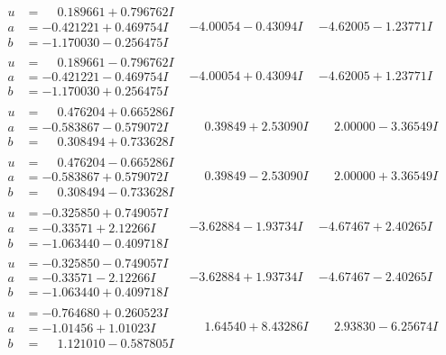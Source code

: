 \documentclass[1p]{elsarticle_modified}
\theoremstyle{definition}
\begin{document}
$$\begin{array}{c|c|c}
\begin{aligned}
u &= \phantom{-}0.189661 + 0.796762 I \\
a &= -0.421221 + 0.469754 I \\
b &= -1.170030 - 0.256475 I\end{aligned}
 & -4.00054 - 0.43094 I & -4.62005 - 1.23771 I \\ \hline\begin{aligned}
u &= \phantom{-}0.189661 - 0.796762 I \\
a &= -0.421221 - 0.469754 I \\
b &= -1.170030 + 0.256475 I\end{aligned}
 & -4.00054 + 0.43094 I & -4.62005 + 1.23771 I \\ \hline\begin{aligned}
u &= \phantom{-}0.476204 + 0.665286 I \\
a &= -0.583867 - 0.579072 I \\
b &= \phantom{-}0.308494 + 0.733628 I\end{aligned}
 & \phantom{-}0.39849 + 2.53090 I & \phantom{-}2.00000 - 3.36549 I \\ \hline\begin{aligned}
u &= \phantom{-}0.476204 - 0.665286 I \\
a &= -0.583867 + 0.579072 I \\
b &= \phantom{-}0.308494 - 0.733628 I\end{aligned}
 & \phantom{-}0.39849 - 2.53090 I & \phantom{-}2.00000 + 3.36549 I \\ \hline\begin{aligned}
u &= -0.325850 + 0.749057 I \\
a &= -0.33571 + 2.12266 I \\
b &= -1.063440 - 0.409718 I\end{aligned}
 & -3.62884 - 1.93734 I & -4.67467 + 2.40265 I \\ \hline\begin{aligned}
u &= -0.325850 - 0.749057 I \\
a &= -0.33571 - 2.12266 I \\
b &= -1.063440 + 0.409718 I\end{aligned}
 & -3.62884 + 1.93734 I & -4.67467 - 2.40265 I \\ \hline\begin{aligned}
u &= -0.764680 + 0.260523 I \\
a &= -1.01456 + 1.01023 I \\
b &= \phantom{-}1.121010 - 0.587805 I\end{aligned}
 & \phantom{-}1.64540 + 8.43286 I & \phantom{-}2.93830 - 6.25674 I \\ \hline\begin{aligned}

\end{aligned}
\end{array}$$
\end{document}

